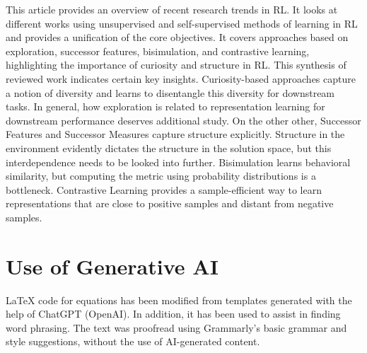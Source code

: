\documentclass{article}
\begin{document}
This article provides an overview of recent research trends in RL. It looks at different works using unsupervised and self-supervised methods of learning in RL and provides a unification of the core objectives. It covers approaches based on exploration, successor features, bisimulation, and contrastive learning, highlighting the importance of curiosity and structure in RL. This synthesis of reviewed work indicates certain key insights. Curiosity-based approaches capture a notion of diversity and learns to disentangle this diversity for downstream tasks. In general, how exploration is related to representation learning for downstream performance deserves additional study. On the other other, Successor Features and Successor Measures capture structure explicitly. Structure in the environment evidently dictates the structure in the solution space, but this interdependence needs to be looked into further. Bisimulation learns behavioral similarity, but computing the metric using probability distributions is a bottleneck. Contrastive Learning provides a sample-efficient way to learn representations that are close to positive samples and distant from negative samples. 



\section{Use of Generative AI}
LaTeX code for equations has been modified from templates generated with the help of ChatGPT (OpenAI). In addition, it has been used to assist in finding word phrasing. The text was proofread using Grammarly’s basic grammar and style suggestions, without the use of AI-generated content. 
\end{document}
